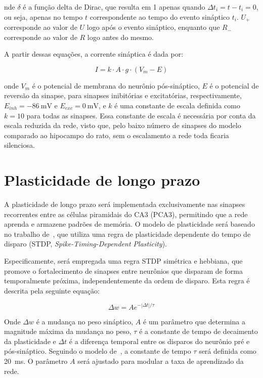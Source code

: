 nde $\delta$ é a função delta de Dirac, que resulta em 1 apenas quando $\Delta t_i = t - t_i = 0$, ou seja, apenas no tempo $t$
correspondente ao tempo do evento sináptico $t_i$. $U_{+}$ corresponde ao valor de $U$ logo após o evento sináptico, enquanto que
$R_{-}$ corresponde ao valor de $R$ logo antes do mesmo.

A partir dessas equações, a corrente sináptica é dada por:

\begin{equation}
    \label{eq_tsodyks_I}
    I = k \cdot A \cdot g \cdot (V_m - E)
\end{equation}

onde $V_m$ é o potencial de membrana do neurônio pós-sináptico, $E$ é o potencial de reversão da sinapse, para sinapses
inibitórias e excitatórias, respectivamente, $E_{inh} = \SI{-86}{\milli\volt}$ e $E_{exc} = \SI{0}{\milli\volt}$, e $k$
é uma constante de escala definida como $k = 10$ para todas as sinapses. Essa constante de escala é necessária por conta
da escala reduzida da rede, visto que, pelo baixo número de sinapses do modelo comparado ao hipocampo do rato, sem o 
escalamento a rede toda ficaria silenciosa.





\section{Plasticidade de longo prazo}

A plasticidade de longo prazo será implementada exclusivamente nas sinapses recorrentes entre as células piramidais do CA3 (PCA3),
permitindo que a rede aprenda e armazene padrões de memória. O modelo de plasticidade será baseado no trabalho
de~, que utiliza uma regra de plasticidade dependente do tempo de disparo (STDP,
\textit{Spike-Timing-Dependent Plasticity}).

Especificamente, será empregada uma regra STDP simétrica e hebbiana, que promove o fortalecimento de sinapses entre neurônios que
disparam de forma temporalmente próxima, independentemente da ordem de disparo. Esta regra é descrita pela seguinte equação: 

\begin{equation}
    \label{eq:stdp}
    \Delta w = A e^{-|\Delta t|/\tau}
\end{equation}

Onde $\Delta w$ é a mudança no peso sináptico, $A$ é um parâmetro que determina a magnitude máxima da mudança no peso, $\tau$ é a
constante de tempo de decaimento da plasticidade e $\Delta t$ é a diferença temporal entre os disparos do neurônio pré e
pós-sináptico. Seguindo o modelo de~\cite{kopsickFormation2024}, a constante de tempo $\tau$ será definida como
\SI{20}{\milli\second}. O parâmetro $A$ será ajustado para modular a taxa de aprendizado da rede.

